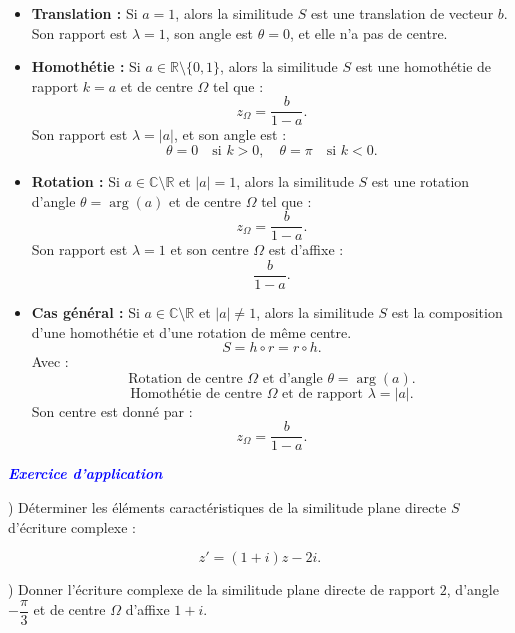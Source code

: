 \documentclass[12pt,a4paper]{article}
\begin{document}
\begin{itemize}
    \item \textbf{Translation :} Si \( a = 1 \), alors la similitude \( S \) est une translation de vecteur \( b \). 
    Son rapport est \( \lambda = 1 \), son angle est \( \theta = 0 \), et elle n’a pas de centre.

    \item \textbf{Homothétie :} Si \( a \in \mathbb{R} \setminus \{0,1\} \), alors la similitude \( S \) est une homothétie de rapport \( k = a \) et de centre \( \Omega \) tel que :
    \[
    z_{\Omega} = \frac{b}{1 - a}.
    \]
    Son rapport est \( \lambda = |a| \), et son angle est :
    \[
    \theta = 0 \quad \text{si } k > 0, \quad \theta = \pi \quad \text{si } k < 0.
    \]

    \item \textbf{Rotation :} Si \( a \in \mathbb{C} \setminus \mathbb{R} \) et \( |a| = 1 \), alors la similitude \( S \) est une rotation d’angle \( \theta = \arg(a) \) et de centre \( \Omega \) tel que :
    \[
    z_{\Omega} = \frac{b}{1 - a}.
    \]
    Son rapport est \( \lambda = 1 \) et son centre \( \Omega \) est d’affixe :
    \[
    \frac{b}{1 - a}.
    \]

    \item \textbf{Cas général :} Si \( a \in \mathbb{C} \setminus \mathbb{R} \) et \( |a| \neq 1 \), alors la similitude \( S \) est la composition d’une homothétie et d’une rotation de même centre.
    \[
    S = h \circ r = r \circ h.
    \]
    Avec :
    \[
    \text{Rotation de centre } \Omega \text{ et d’angle } \theta = \arg(a).
    \]
    \[
    \text{Homothétie de centre } \Omega \text{ et de rapport } \lambda = |a|.
    \]
    Son centre est donné par :
    \[
    z_{\Omega} = \frac{b}{1 - a}.
    \]
\end{itemize}

\textbf{\textcolor{blue}{\textit{Exercice d’application}}}

\vspace{0.3cm}

) Déterminer les éléments caractéristiques de la similitude plane directe \( S \) d’écriture complexe :

\[
z' = (1 + i) z - 2i.
\]

\vspace{0.3cm}

) Donner l’écriture complexe de la similitude plane directe de rapport \( 2 \), d’angle \( -\dfrac{\pi}{3} \) et de centre \( \Omega \) d’affixe \( 1 + i \).
\end{document}
